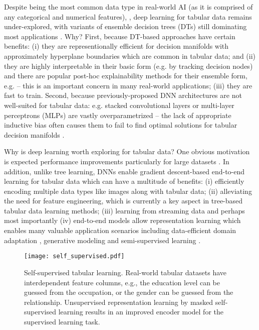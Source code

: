 Despite being the most common data type in real-world AI (as it is comprised of any categorical and numerical features), \citep{mckinsey_report}, deep learning for tabular data remains under-explored, with variants of ensemble decision trees (DTs) still dominating most applications \citep{kaggletrends}.
Why?
First, because DT-based approaches have certain benefits: 
(i) they are representionally efficient for decision manifolds with approximately hyperplane boundaries which are common in tabular data; and
(ii) they are highly interpretable in their basic form (e.g. by tracking decision nodes) and there are popular post-hoc explainability methods for their ensemble form, e.g. \citep{shap} -- this is an important concern in many real-world applications;
(iii) they are fast to train. 
Second, because previously-proposed DNN architectures are not well-suited for tabular data: e.g. stacked convolutional layers or multi-layer perceptrons (MLPs) are vastly overparametrized -- the lack of appropriate inductive bias often causes them to fail to find optimal solutions for tabular decision manifolds \citep{Goodfellow2016, shavitt2018regularization, tablegan}. 

Why is deep learning worth exploring for tabular data? 
One obvious motivation is expected performance improvements particularly for large datasets \citep{deep_learning_scaling}. 
In addition, unlike tree learning,
DNNs enable gradient descent-based end-to-end learning for tabular data which can have a multitude of benefits: 
(i) efficiently encoding multiple data types like images along with tabular data;
(ii) alleviating the need for feature engineering, which is currently a key aspect in tree-based tabular data learning methods;
(iii) learning from streaming data
and perhaps most importantly
(iv) end-to-end models allow representation learning which enables many valuable application scenarios including data-efficient domain adaptation \citep{Goodfellow2016}, generative modeling \citep{unsupervised_rep_gan} and semi-supervised learning \citep{good_ssl}.

\begin{figure*}[!ht]

\centering
\texttt{[image: self\_supervised.pdf]}

\caption{Self-supervised tabular learning. Real-world tabular datasets have interdependent feature columns, e.g., the education level can be guessed from the occupation, or the gender can be guessed from the relationship. Unsupervised representation learning by masked self-supervised learning results in an improved encoder model for the supervised learning task.}
\label{fig:self_supervised}
\end{figure*}

